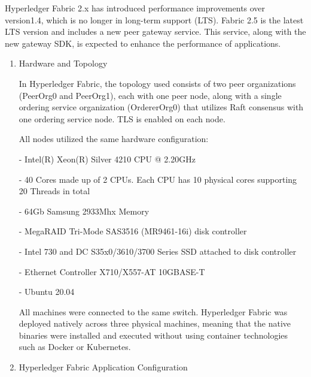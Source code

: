 \documentclass[conference]{IEEEtran}
\begin{document}
\begin{enumerate}[itemsep=2ex, parsep=1ex]
	      Hyperledger Fabric 2.x has introduced performance improvements over
	      version1.4, which is no longer in long-term support (LTS). Fabric 2.5 is the
	      latest LTS version and includes a new peer gateway service. This service, along
	      with the new gateway SDK, is expected to enhance the performance of
	      applications.
	      	      
	      \begin{enumerate}[itemsep=2ex, parsep=1ex]
	      	\item Hardware and Topology
	      	      	      	      
	      	      In Hyperledger Fabric, the topology used consists of two peer organizations
	      	      (PeerOrg0 and PeerOrg1), each with one peer node, along with a single ordering
	      	      service organization (OrdererOrg0) that utilizes Raft consensus with one
	      	      ordering service node. TLS is enabled on each node.
	      	      	      	      
	      	      All nodes utilized the same hardware configuration:
	      	      	      	      
	      	      - Intel(R) Xeon(R) Silver 4210 CPU @ 2.20GHz
	      	      	      	      
	      	      - 40 Cores made up of 2 CPUs. Each CPU has 10 physical cores supporting
	      	      20 Threads in total
	      	      	      	      
	      	      - 64Gb Samsung 2933Mhx Memory
	      	      	      	      
	      	      - MegaRAID Tri-Mode SAS3516 (MR9461-16i) disk controller
	      	      	      	      
	      	      - Intel 730 and DC S35x0/3610/3700 Series SSD attached to disk
	      	      controller
	      	      	      	      
	      	      - Ethernet Controller X710/X557-AT 10GBASE-T
	      	      	      	      
	      	      - Ubuntu 20.04
	      	      	      	      
	      	      All machines were connected to the same switch. Hyperledger Fabric was
	      	      deployed natively across three physical machines, meaning that the native
	      	      binaries were installed and executed without using container technologies
	      	      such as Docker or Kubernetes.
	      	      	      	      
	      	\item Hyperledger Fabric Application Configuration
	      	      	      	      

\end{enumerate}
\end{enumerate}
\end{document}
